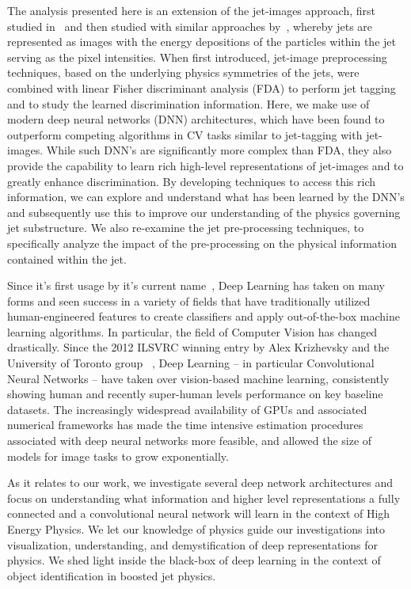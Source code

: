 \documentclass{article}
\begin{document}
The analysis presented here is an extension of the jet-images approach, first studied in~\cite{Cogan:2014oua} and then studied with similar approaches by~\cite{Others}, whereby jets are represented as images with the energy depositions of the particles within the jet serving as the pixel intensities.  When first introduced, jet-image preprocessing techniques, based on the underlying physics symmetries of the jets, were combined with linear Fisher discriminant analysis (FDA) to perform jet tagging and to study the learned discrimination information.  Here, we make use of modern deep neural networks (DNN) architectures, which have been found to outperform competing algorithms in CV tasks similar to jet-tagging with jet-images.  While such DNN's are significantly more complex than FDA, they also provide the capability to learn rich high-level representations of jet-images and to greatly enhance discrimination.  By developing techniques to access this rich information, we can explore and understand what has been learned by the DNN's and subsequently use this to improve our understanding of the physics governing jet substructure.  We also re-examine the jet pre-processing techniques, to specifically analyze the impact of the pre-processing on the physical information contained within the jet.

Since it's first usage by it's current name~\cite{hinton06}, Deep Learning has taken on many forms and seen success in a variety of fields that have traditionally utilized human-engineered features to create classifiers and apply out-of-the-box machine learning algorithms. In particular, the field of Computer Vision has changed drastically. Since the 2012 ILSVRC winning entry by Alex Krizhevsky and the University of Toronto group ~\cite{alexnet}, Deep Learning -- in particular Convolutional Neural Networks -- have taken over vision-based machine learning, consistently showing human and recently super-human levels performance on key baseline datasets. The increasingly widespread availability of GPUs and associated numerical frameworks has made the time intensive estimation procedures associated with deep neural networks more feasible, and allowed the size of models for image tasks to grow exponentially. 

As it relates to our work, we investigate several deep network architectures and focus on  understanding what information and higher level representations a fully connected and a convolutional neural network will learn in the context of High Energy Physics. We let our knowledge of physics guide our investigations into visualization, understanding, and demystification of deep representations for physics. We shed light inside the black-box of deep learning in the context of object identification in boosted jet physics.
\end{document}
